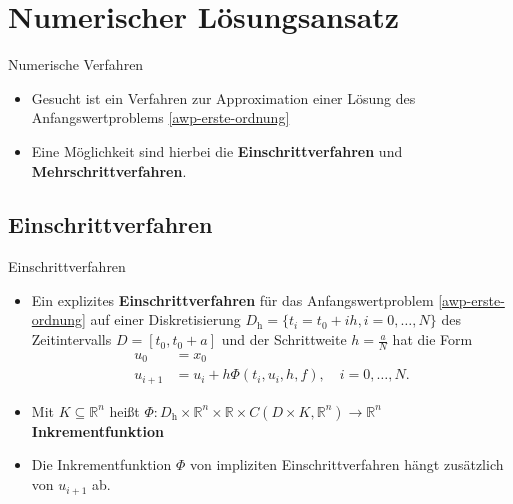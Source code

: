 \section{Numerischer Lösungsansatz}

\begin{frame}{Numerische Verfahren}
    \begin{itemize}
        \item<1-> Gesucht ist ein Verfahren zur Approximation einer Lösung des Anfangswertproblems
        \eqref{awp-erste-ordnung}
        \item<2-> Eine Möglichkeit sind hierbei die \textbf{Einschrittverfahren} und \textbf{Mehrschrittverfahren}.
    \end{itemize}
\end{frame}

\subsection{Einschrittverfahren}

\begin{frame}{Einschrittverfahren}
    \begin{itemize}
        \item<1-> Ein explizites \textbf{Einschrittverfahren} für das Anfangswertproblem \eqref{awp-erste-ordnung} auf
        einer Diskretisierung $D_{\text{h}}=\{t_i=t_0+ih, i=0,\dots,N\}$ des Zeitintervalls $D=[t_0,t_0+a]$ und der
        Schrittweite $h=\frac{a}{N}$ hat die Form
        \begin{align}
            \label{einschrittverfahren}
            u_0 &= x_0 \nonumber \\
            u_{i+1} &= u_i + h \Phi(t_i,u_i, h, f), \quad i=0,\dots,N.
        \end{align}
        \item<2-> Mit $K\subseteq \mathbb{R}^n$ heißt
        $\Phi: D_{\text{h}} \times \mathbb{R}^n \times \mathbb{R} \times
        C(D \times K, \mathbb{R}^n) \rightarrow \mathbb{R}^n$ \textbf{Inkrementfunktion}
        \item Die Inkrementfunktion $\Phi$ von impliziten Einschrittverfahren hängt zusätzlich von $u_{i+1}$ ab.
    \end{itemize}
\end{frame}

